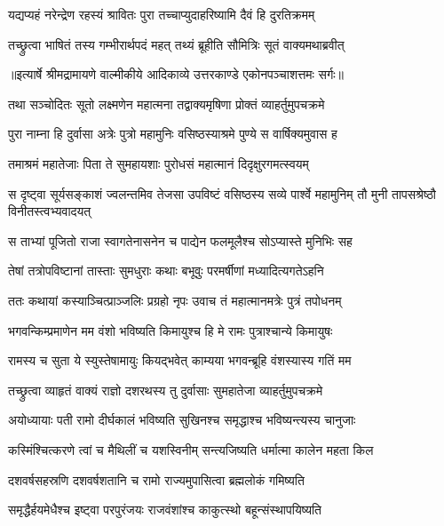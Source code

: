 \twolineshloka
{यद्यप्यहं नरेन्द्रेण रहस्यं श्रावितः पुरा}
{तच्चाप्युदाहरिष्यामि दैवं हि दुरतिक्रमम्} %

\twolineshloka
{तच्छ्रुत्वा भाषितं तस्य गम्भीरार्थपदं महत्}
{तथ्यं ब्रूहीति सौमित्रिः सूतं वाक्यमथाब्रवीत्} %


{॥इत्यार्षे श्रीमद्रामायणे वाल्मीकीये आदिकाव्ये उत्तरकाण्डे एकोनपञ्चाशत्तमः सर्गः॥}


\twolineshloka
{तथा सञ्चोदितः सूतो लक्ष्मणेन महात्मना}
{तद्वाक्यमृषिणा प्रोक्तं व्याहर्तुमुपचक्रमे} %

\twolineshloka
{पुरा नाम्ना हि दुर्वासा अत्रेः पुत्रो महामुनिः}
{वसिष्ठस्याश्रमे पुण्ये स वार्षिक्यमुवास ह} %

\twolineshloka
{तमाश्रमं महातेजाः पिता ते सुमहायशाः}
{पुरोधसं महात्मानं दिदृक्षुरगमत्स्वयम्} %

\threelineshloka
{स दृष्ट्वा सूर्यसङ्काशं ज्वलन्तमिव तेजसा}
{उपविष्टं वसिष्ठस्य सव्ये पार्श्वे महामुनिम्}
{तौ मुनी तापसश्रेष्ठौ विनीतस्त्वभ्यवादयत्} %

\twolineshloka
{स ताभ्यां पूजितो राजा स्वागतेनासनेन च}
{पाद्येन फलमूलैश्च सोऽप्यास्ते मुनिभिः सह} %

\twolineshloka
{तेषां तत्रोपविष्टानां तास्ताः सुमधुराः कथाः}
{बभूवुः परमर्षीणां मध्यादित्यगतेऽहनि} %

\twolineshloka
{ततः कथायां कस्याञ्चित्प्राञ्जलिः प्रग्रहो नृपः}
{उवाच तं महात्मानमत्रेः पुत्रं तपोधनम्} %

\twolineshloka
{भगवन्किम्प्रमाणेन मम वंशो भविष्यति}
{किमायुश्च हि मे रामः पुत्राश्चान्ये किमायुषः} %

\twolineshloka
{रामस्य च सुता ये स्युस्तेषामायुः कियद्भवेत्}
{काम्यया भगवन्ब्रूहि वंशस्यास्य गतिं मम} %

\twolineshloka
{तच्छ्रुत्वा व्याहृतं वाक्यं राज्ञो दशरथस्य तु}
{दुर्वासाः सुमहातेजा व्याहर्तुमुपचक्रमे} %

\twolineshloka
{अयोध्यायाः पती रामो दीर्घकालं भविष्यति}
{सुखिनश्च समृद्धाश्च भविष्यन्त्यस्य चानुजाः} %

\twolineshloka
{कस्मिंश्चित्करणे त्वां च मैथिलीं च यशस्विनीम्}
{सन्त्यजिष्यति धर्मात्मा कालेन महता किल} %

\twolineshloka
{दशवर्षसहस्रणि दशवर्षशतानि च}
{रामो राज्यमुपासित्वा ब्रह्मलोकं गमिष्यति} %

\twolineshloka
{समृद्धैर्हयमेधैश्च इष्ट्वा परपुरंजयः}
{राजवंशांश्च काकुत्स्थो बहून्संस्थापयिष्यति} %

